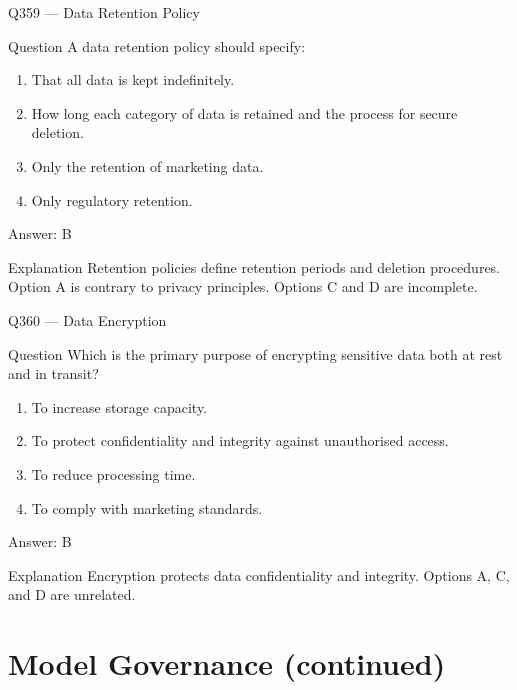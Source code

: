 \documentclass[aspectratio=169,8pt]{beamer}
\begin{document}
	\begin{frame}{Q359 --- Data Retention Policy}
		\begin{block}{Question}
			A data retention policy should specify:
			\begin{enumerate}
				\item That all data is kept indefinitely.
				\item How long each category of data is retained and the process for secure deletion.
				\item Only the retention of marketing data.
				\item Only regulatory retention.
			\end{enumerate}
		\end{block}
		\begin{exampleblock}{Answer: B}\end{exampleblock}
		\begin{block}{Explanation}
			Retention policies define retention periods and deletion procedures. Option A is contrary to privacy principles. Options C and D are incomplete.
		\end{block}
	\end{frame}
	
	\begin{frame}{Q360 --- Data Encryption}
		\begin{block}{Question}
			Which is the primary purpose of encrypting sensitive data both at rest and in transit?
			\begin{enumerate}
				\item To increase storage capacity.
				\item To protect confidentiality and integrity against unauthorised access.
				\item To reduce processing time.
				\item To comply with marketing standards.
			\end{enumerate}
		\end{block}
		\begin{exampleblock}{Answer: B}\end{exampleblock}
		\begin{block}{Explanation}
			Encryption protects data confidentiality and integrity. Options A, C, and D are unrelated.
		\end{block}
	\end{frame}
	
	\section{Model Governance (continued)}
	
\end{document}
